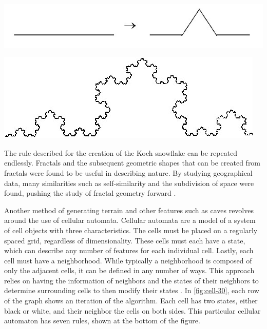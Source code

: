 \documentclass[10pt]{report}
\begin{document}
		\begin{minipage}{\textwidth}
			\centering
			\includegraphics[scale=0.5]{m_reprule}
			\label{fig:m_reprule}
		\end{minipage}
		
		\begin{minipage}{\textwidth}
			\centering
			\includegraphics[scale=0.5]{m_koch}
			\label{fig:m_koch}
		\end{minipage}
	
		The rule described for the creation of the Koch snowflake can be repeated endlessly. Fractals and the subsequent geometric shapes that can be created from fractals were found to be useful in describing nature. By studying geographical data, many similarities such as self-similarity and the subdivision of space were found, pushing the study of fractal geometry forward \cite{doi:10.1111/j.1467-8306.1987.tb00158.x}. 
		
		Another method of generating terrain and other features such as caves \cite{10.1145/1814256.1814266} revolves around the use of cellular automata. Cellular automata are a model of a system of cell objects with three characteristics. The cells must be placed on a regularly spaced grid, regardless of dimensionality. These cells must each have a state, which can describe any number of features for each individual cell. Lastly, each cell must have a neighborhood. While typically a neighborhood is composed of only the adjacent cells, it can be defined in any number of ways. This approach relies on having the information of neighbors and the states of their neighbors to determine surrounding cells to then modify their states \cite{nature-of-code}. In \autoref{fig:cell-30}, each row of the graph shows an iteration of the algorithm. Each cell has two states, either black or white, and their neighbor the cells on both sides. This particular cellular automaton has seven rules, shown at the bottom of the figure. 
		
\end{document}
